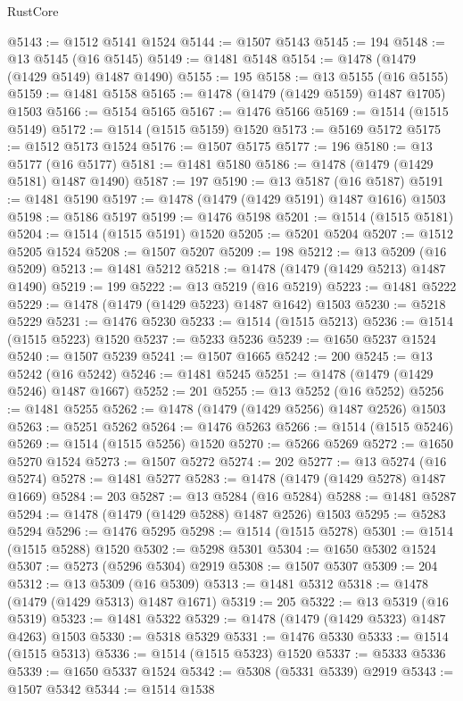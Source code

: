 \begin{lexlean}{RustCore}
\begin{coremodule}
@5143 := @1512 @5141 @1524
@5144 := @1507 @5143
@5145 := 194
@5148 := @13 @5145 (@16 @5145)
@5149 := @1481 @5148
@5154 := @1478 (@1479 (@1429 @5149) @1487 @1490)
@5155 := 195
@5158 := @13 @5155 (@16 @5155)
@5159 := @1481 @5158
@5165 := @1478 (@1479 (@1429 @5159) @1487 @1705) @1503
@5166 := @5154 @5165
@5167 := @1476 @5166
@5169 := @1514 (@1515 @5149)
@5172 := @1514 (@1515 @5159) @1520
@5173 := @5169 @5172
@5175 := @1512 @5173 @1524
@5176 := @1507 @5175
@5177 := 196
@5180 := @13 @5177 (@16 @5177)
@5181 := @1481 @5180
@5186 := @1478 (@1479 (@1429 @5181) @1487 @1490)
@5187 := 197
@5190 := @13 @5187 (@16 @5187)
@5191 := @1481 @5190
@5197 := @1478 (@1479 (@1429 @5191) @1487 @1616) @1503
@5198 := @5186 @5197
@5199 := @1476 @5198
@5201 := @1514 (@1515 @5181)
@5204 := @1514 (@1515 @5191) @1520
@5205 := @5201 @5204
@5207 := @1512 @5205 @1524
@5208 := @1507 @5207
@5209 := 198
@5212 := @13 @5209 (@16 @5209)
@5213 := @1481 @5212
@5218 := @1478 (@1479 (@1429 @5213) @1487 @1490)
@5219 := 199
@5222 := @13 @5219 (@16 @5219)
@5223 := @1481 @5222
@5229 := @1478 (@1479 (@1429 @5223) @1487 @1642) @1503
@5230 := @5218 @5229
@5231 := @1476 @5230
@5233 := @1514 (@1515 @5213)
@5236 := @1514 (@1515 @5223) @1520
@5237 := @5233 @5236
@5239 := @1650 @5237 @1524
@5240 := @1507 @5239
@5241 := @1507 @1665
@5242 := 200
@5245 := @13 @5242 (@16 @5242)
@5246 := @1481 @5245
@5251 := @1478 (@1479 (@1429 @5246) @1487 @1667)
@5252 := 201
@5255 := @13 @5252 (@16 @5252)
@5256 := @1481 @5255
@5262 := @1478 (@1479 (@1429 @5256) @1487 @2526) @1503
@5263 := @5251 @5262
@5264 := @1476 @5263
@5266 := @1514 (@1515 @5246)
@5269 := @1514 (@1515 @5256) @1520
@5270 := @5266 @5269
@5272 := @1650 @5270 @1524
@5273 := @1507 @5272
@5274 := 202
@5277 := @13 @5274 (@16 @5274)
@5278 := @1481 @5277
@5283 := @1478 (@1479 (@1429 @5278) @1487 @1669)
@5284 := 203
@5287 := @13 @5284 (@16 @5284)
@5288 := @1481 @5287
@5294 := @1478 (@1479 (@1429 @5288) @1487 @2526) @1503
@5295 := @5283 @5294
@5296 := @1476 @5295
@5298 := @1514 (@1515 @5278)
@5301 := @1514 (@1515 @5288) @1520
@5302 := @5298 @5301
@5304 := @1650 @5302 @1524
@5307 := @5273 (@5296 @5304) @2919
@5308 := @1507 @5307
@5309 := 204
@5312 := @13 @5309 (@16 @5309)
@5313 := @1481 @5312
@5318 := @1478 (@1479 (@1429 @5313) @1487 @1671)
@5319 := 205
@5322 := @13 @5319 (@16 @5319)
@5323 := @1481 @5322
@5329 := @1478 (@1479 (@1429 @5323) @1487 @4263) @1503
@5330 := @5318 @5329
@5331 := @1476 @5330
@5333 := @1514 (@1515 @5313)
@5336 := @1514 (@1515 @5323) @1520
@5337 := @5333 @5336
@5339 := @1650 @5337 @1524
@5342 := @5308 (@5331 @5339) @2919
@5343 := @1507 @5342
@5344 := @1514 @1538

\end{coremodule}
\end{lexlean}
